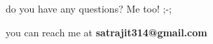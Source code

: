 \documentclass[handout]{beamer}
\begin{document}
    \begin{frame}
        \begin{center}
            \large do you have any questions? Me too! ;-;

            you can reach me at \textbf{satrajit314@gmail.com}

        \end{center}
    \end{frame}
\end{document}
